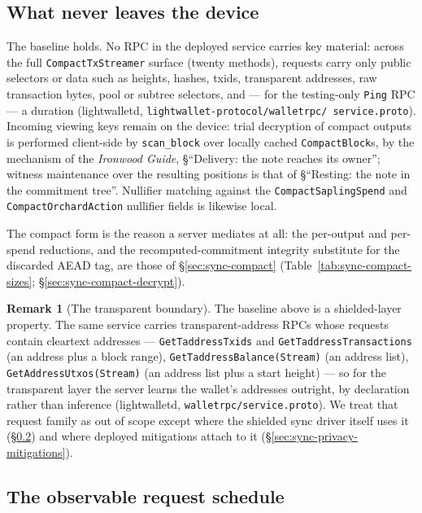\documentclass[11pt,a4paper]{article}
\theoremstyle{definition}
\newtheorem{remark}[theorem]{Remark}
\begin{document}
\subsection{What never leaves the device}\label{sec:sync-privacy-local}

The baseline holds. No RPC in the deployed service carries key material:
across the full \texttt{CompactTxStreamer} surface (twenty methods), requests
carry only public selectors or data such as heights, hashes, txids,
transparent addresses, raw transaction bytes, pool or subtree selectors,
and --- for the testing-only \texttt{Ping} RPC --- a duration
(\textsf{lightwalletd},
\texttt{lightwallet-\allowbreak protocol/\allowbreak walletrpc/\allowbreak
service.proto}). Incoming viewing
keys remain on the device: trial decryption of compact outputs is performed
client-side by \texttt{scan\_block} over locally cached
\texttt{CompactBlock}s, by the mechanism of the \emph{Ironwood Guide},
\S``Delivery: the note reaches its owner''; witness maintenance over the
resulting positions is that
of \S``Resting: the note in the commitment tree''.
Nullifier matching against the \texttt{CompactSaplingSpend} and
\texttt{CompactOrchardAction} nullifier fields is likewise local.

The compact form is the reason a server mediates at all: the per-output
and per-spend reductions, and the recomputed-commitment integrity
substitute for the discarded AEAD tag, are those of
\S\ref{sec:sync-compact} (Table~\ref{tab:sync-compact-sizes};
\S\ref{sec:sync-compact-decrypt}).

\begin{remark}[The transparent boundary]\label{rem:sync-transparent}
The baseline above is a shielded-layer property. The same service carries
transparent-address RPCs whose requests contain cleartext addresses ---
\texttt{GetTaddressTxids} and \texttt{GetTaddressTransactions} (an address
plus a block range), \texttt{GetTaddressBalance(Stream)} (an address list),
\texttt{GetAddressUtxos(Stream)} (an address list plus a start height) ---
so for the transparent layer the server learns the wallet's addresses
outright, by declaration rather than inference (\textsf{lightwalletd},
\texttt{walletrpc/service.proto}). We treat that
request family as out of scope except where the shielded sync driver itself
uses it (\S\ref{sec:sync-privacy-schedule}) and where deployed mitigations
attach to it (\S\ref{sec:sync-privacy-mitigations}).
\end{remark}

\subsection{The observable request schedule}\label{sec:sync-privacy-schedule}
\end{document}
